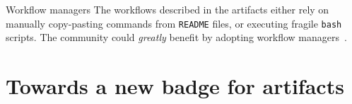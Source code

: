\documentclass[sigconf,natbib=false]{acmart}
\newcommand{\todo}[1]{{\color{red}{TODO: #1}}}
\begin{document}
\begin{lesson}{Workflow managers}{}
  The workflows described in the artifacts either rely on manually copy-pasting commands from \texttt{README} files, or executing fragile \texttt{bash} scripts.
  The community could \emph{greatly} benefit by adopting workflow managers\ \cite{wratten2021reproducible}.
\end{lesson}

% 

%
\section{Towards a new badge for artifacts}\label{sec:longevity}

\end{document}
